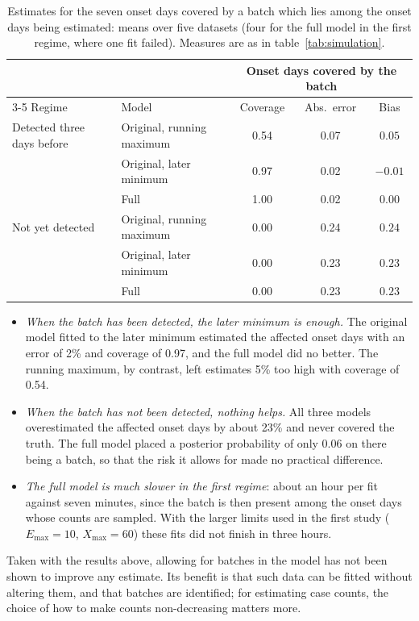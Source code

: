 \documentclass[11pt,a4paper]{article}
\newcommand{\Emax}{E_{\max}}
\newcommand{\Xmax}{X_{\max}}
\begin{document}
\begin{table}[h]
\centering
\begin{tabular}{llccc}
\toprule
 & & \multicolumn{3}{c}{Onset days covered by the batch} \\
\cmidrule(lr){3-5}
Regime & Model & Coverage & Abs.\ error & Bias \\
\midrule
Detected three days before & Original, running maximum & 0.54 & 0.07 & $0.05$ \\
 & Original, later minimum & 0.97 & 0.02 & $-0.01$ \\
 & Full & 1.00 & 0.02 & $0.00$ \\
\addlinespace
Not yet detected & Original, running maximum & 0.00 & 0.24 & $0.24$ \\
 & Original, later minimum & 0.00 & 0.23 & $0.23$ \\
 & Full & 0.00 & 0.23 & $0.23$ \\
\bottomrule
\end{tabular}
\caption{Estimates for the seven onset days covered by a batch which lies
among the onset days being estimated: means over five datasets (four for the
full model in the first regime, where one fit failed). Measures are as in
table~\ref{tab:simulation}.}
\label{tab:frontier}
\end{table}

\begin{itemize}[itemsep=2pt]
\item \emph{When the batch has been detected, the later minimum is enough.}
The original model fitted to the later minimum estimated the affected onset
days with an error of 2\% and coverage of 0.97, and the full model did no
better. The running maximum, by contrast, left estimates 5\% too high with
coverage of 0.54.
\item \emph{When the batch has not been detected, nothing helps.} All three
models overestimated the affected onset days by about 23\% and never covered
the truth. The full model placed a posterior probability of only 0.06 on there
being a batch, so that the risk it allows for made no practical difference.
\item \emph{The full model is much slower in the first regime}: about an hour
per fit against seven minutes, since the batch is then present among the onset
days whose counts are sampled. With the larger limits used in the first study
($\Emax=10$, $\Xmax=60$) these fits did not finish in three hours.
\end{itemize}

Taken with the results above, allowing for batches in the model has not been
shown to improve any estimate. Its benefit is that such data can be fitted
without altering them, and that batches are identified; for estimating case
counts, the choice of how to make counts non-decreasing matters more.
\end{document}
